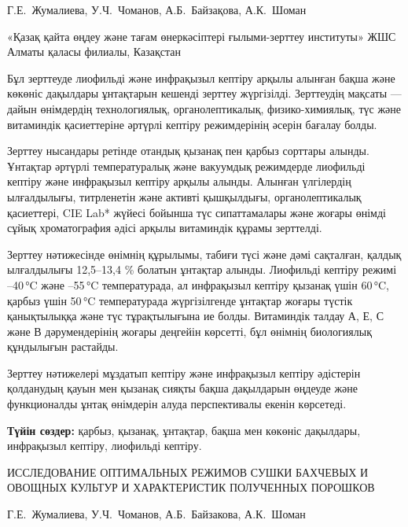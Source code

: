 
\begin{header}

Г.Е.~Жумалиева\envelope,
У.Ч.~Чоманов,
А.Б.~Байзақова,
А.К.~Шоман
\end{header}

\begin{affil}
«Қазақ қайта өңдеу және тағам өнеркәсіптері ғылыми-зерттеу институты» ЖШС Алматы қаласы филиалы, Казақстан

\end{affil}

Бұл зерттеуде лиофильді және инфрақызыл кептіру арқылы алынған бақша
және көкөніс дақылдары ұнтақтарын кешенді зерттеу жүргізілді. Зерттеудің
мақсаты --- дайын өнімдердің технологиялық, органолептикалық,
физико-химиялық, түс және витаминдік қасиеттеріне әртүрлі кептіру
режимдерінің әсерін бағалау болды.

Зерттеу нысандары ретінде отандық қызанақ пен қарбыз сорттары алынды.
Ұнтақтар әртүрлі температуралық және вакуумдық режимдерде лиофильді
кептіру және инфрақызыл кептіру арқылы алынды. Алынған үлгілердің
ылғалдылығы, титрленетін және активті қышқылдығы, органолептикалық
қасиеттері, CIE Lab* жүйесі бойынша түс сипаттамалары және жоғары өнімді
сұйық хроматография әдісі арқылы витаминдік құрамы зерттелді.

Зерттеу нәтижесінде өнімнің құрылымы, табиғи түсі және дәмі сақталған,
қалдық ылғалдылығы 12,5--13,4 \% болатын ұнтақтар алынды. Лиофильді
кептіру режимі --40\,°C және --55\,°C температурада, ал инфрақызыл
кептіру қызанақ үшін 60\,°C, қарбыз үшін 50\,°C температурада
жүргізілгенде ұнтақтар жоғары түстік қанықтылыққа және түс тұрақтылығына
ие болды. Витаминдік талдау А, Е, С және В дәрумендерінің жоғары
деңгейін көрсетті, бұл өнімнің биологиялық құндылығын растайды.

Зерттеу нәтижелері мұздатып кептіру және инфрақызыл кептіру әдістерін
қолданудың қауын мен қызанақ сияқты бақша дақылдарын өңдеуде және
функционалды ұнтақ өнімдерін алуда перспективалы екенін көрсетеді.

{\bfseries Түйін сөздер:} қарбыз, қызанақ, ұнтақтар, бақша мен көкөніс
дақылдары, инфрақызыл кептіру, лиофильді кептіру.

\begin{header}
ИССЛЕДОВАНИЕ ОПТИМАЛЬНЫХ РЕЖИМОВ СУШКИ БАХЧЕВЫХ И ОВОЩНЫХ КУЛЬТУР И ХАРАКТЕРИСТИК ПОЛУЧЕННЫХ ПОРОШКОВ

Г.Е.~Жумалиева\envelope,
У.Ч.~Чоманов,
А.Б.~Байзакова,
А.К.~Шоман
\end{header}

